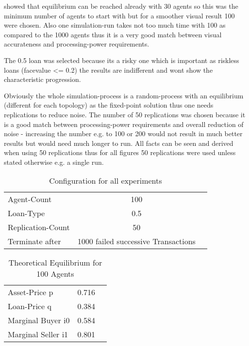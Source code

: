 \documentclass[Bachelorarbeit.tex]{subfiles}
\begin{document}
\bigskip 

\cite{Breuer2015} showed that equilibrium can be reached already with 30 agents so this was the minimum number of agents to start with but for a smoother visual result 100 were chosen. Also one simulation-run takes not too much time with 100 as compared to the 1000 agents thus it is a very good match between visual accurateness and processing-power requirements.

\medskip

The 0.5 loan was selected because its a risky one which is important as riskless loans (facevalue <= 0.2) the results are indifferent and wont show the characteristic progression.

\medskip

Obviously the whole simulation-process is a random-process with an equilibrium (different for each topology) as the fixed-point solution thus one needs replications to reduce noise. The number of 50 replications was chosen because it is a good match between processing-power requirements and overall reduction of noise - increasing the number e.g. to 100 or 200 would not result in much better results but would need much longer to run. All facts can be seen and derived when using 50 replications thus for all figures 50 replications were used unless stated otherwise e.g. a single run.

\begin{table}[h]
	\centering
	\caption{Configuration for all experiments}
	\begin{tabular} { l c r }
		\hline
		Agent-Count & 100 \\
		Loan-Type & 0.5 \\
		Replication-Count & 50 \\
		Terminate after & 1000 failed successive Transactions \\
		\hline
	\end{tabular}
\end{table}

\begin{table}[h]
	\centering
	\caption{Theoretical Equilibrium for 100 Agents}
	\begin{tabular} { l c r }
		\hline
		Asset-Price p & 0.716 \\
		Loan-Price q & 0.384 \\
		Marginal Buyer i0 & 0.584 \\
		Marginal Seller i1 & 0.801 \\
		\hline
	\end{tabular}
\end{table}
\end{document}
